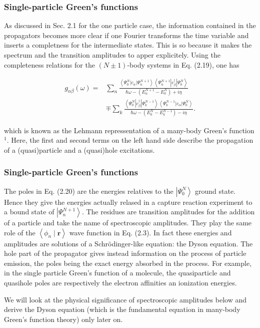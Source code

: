 \documentclass[compress]{beamer}
\begin{document}
\frame
{
\frametitle{Single-particle Green's functions}
\begin{small}
{\scriptsize
As discussed in Sec. 2.1 for the one particle case, the information
contained in the propagators becomes more clear if one Fourier
transforms the time variable and inserts a completness for the
intermediate states. This is so because it makes the spectrum and the
transition amplitudes to apper explicitely. Using the completeness
relations for the $(N \pm 1)$-body systems in Eq. (2.19), one has

$$
\begin{aligned}
g_{\alpha \beta}(\omega)= & \sum_{n} \frac{\left\langle\Psi_{0}^{N}\left|c_{\alpha}\right| \Psi_{n}^{N+1}\right\rangle\left\langle\Psi_{n}^{N+1}\left|c_{\beta}^{\dagger}\right| \Psi_{0}^{N}\right\rangle}{\hbar \omega-\left(E_{n}^{N+1}-E_{0}^{N}\right)+i \eta} \\
& \mp \sum_{k} \frac{\left\langle\Psi_{0}^{N}\left|c_{\beta}^{\dagger}\right| \Psi_{k}^{N-1}\right\rangle\left\langle\Psi_{k}^{N-1}\left|c_{\alpha}\right| \Psi_{0}^{N}\right\rangle}{\hbar \omega-\left(E_{0}^{N}-E_{k}^{N-1}\right)-i \eta} .
\end{aligned}
$$

which is known as the Lehmann repressentation of a many-body Green's
function ${ }^{1}$. Here, the first and second terms on the left hand
side describe the propagation of a (quasi)particle and a (quasi)hole
excitations.

}
\end{small}
}
\frame
{
\frametitle{Single-particle Green's functions}
\begin{small}
{\scriptsize
The poles in Eq. (2.20) are the energies relatives to the
$\left|\Psi_{0}^{N}\right\rangle$ ground state. Hence they give the
energies actually relased in a capture reaction experiment to a bound
state of $\left|\Psi_{n}^{N+1}\right\rangle$. The residues are
transition amplitudes for the addition of a particle and take the name
of spectroscopic amplitudes. They play the same role of the
$\left\langle\phi_{n} \mid \mathbf{r}\right\rangle$ wave function in
Eq. (2.3). In fact these energies and amplitudes are solutions of a
Schrödinger-like equation: the Dyson equation. The hole part of the
propagator gives instead information on the process of particle
emission, the poles being the exact energy absorbed in the
process. For example, in the single particle Green's function of a
molecule, the quasiparticle and quasihole poles are respectively the
electron affinities an ionization energies.

We will look at the physical significance of spectroscopic amplitudes
below and derive the Dyson equation (which is the
fundamental equation in many-body Green's function theory) only later
on.

}
\end{small}
}
\end{document}
